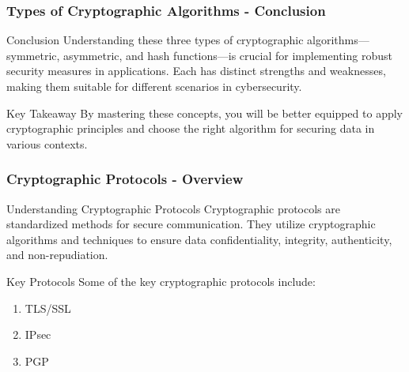 \documentclass{beamer}
\begin{document}
\begin{frame}[fragile]
    \frametitle{Types of Cryptographic Algorithms - Conclusion}
    \begin{block}{Conclusion}
        Understanding these three types of cryptographic algorithms—symmetric, asymmetric, and hash functions—is crucial for implementing robust security measures in applications. Each has distinct strengths and weaknesses, making them suitable for different scenarios in cybersecurity. 
    \end{block}

    \begin{block}{Key Takeaway}
        By mastering these concepts, you will be better equipped to apply cryptographic principles and choose the right algorithm for securing data in various contexts.
    \end{block}
\end{frame}

\begin{frame}[fragile]
    \frametitle{Cryptographic Protocols - Overview}
    \begin{block}{Understanding Cryptographic Protocols}
        Cryptographic protocols are standardized methods for secure communication. They utilize cryptographic algorithms and techniques to ensure data confidentiality, integrity, authenticity, and non-repudiation.
    \end{block}
    
    \begin{block}{Key Protocols}
        Some of the key cryptographic protocols include:
        \begin{enumerate}
            \item TLS/SSL
            \item IPsec
            \item PGP
        \end{enumerate}
    \end{block}
\end{frame}
\end{document}
